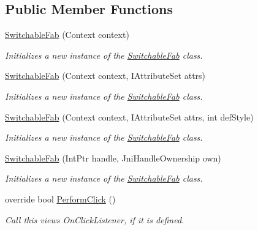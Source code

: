 \subsection*{Public Member Functions}
\begin{DoxyCompactItemize}
\item 
\hyperlink{class_w_c_c_mobile_1_1_switchable_fab_a8427440d9a6834d9a8f4debaf905da7b}{Switchable\+Fab} (Context context)
\begin{DoxyCompactList}\small\item\em Initializes a new instance of the \hyperlink{class_w_c_c_mobile_1_1_switchable_fab}{Switchable\+Fab} class. \end{DoxyCompactList}\item 
\hyperlink{class_w_c_c_mobile_1_1_switchable_fab_a9674454567b1e5661bca32b57ba10ab2}{Switchable\+Fab} (Context context, I\+Attribute\+Set attrs)
\begin{DoxyCompactList}\small\item\em Initializes a new instance of the \hyperlink{class_w_c_c_mobile_1_1_switchable_fab}{Switchable\+Fab} class. \end{DoxyCompactList}\item 
\hyperlink{class_w_c_c_mobile_1_1_switchable_fab_ab4d24c06b64058307cbaeae023a2e142}{Switchable\+Fab} (Context context, I\+Attribute\+Set attrs, int def\+Style)
\begin{DoxyCompactList}\small\item\em Initializes a new instance of the \hyperlink{class_w_c_c_mobile_1_1_switchable_fab}{Switchable\+Fab} class. \end{DoxyCompactList}\item 
\hyperlink{class_w_c_c_mobile_1_1_switchable_fab_a253c5a3888796e89248ff53a9772b2e2}{Switchable\+Fab} (Int\+Ptr handle, Jni\+Handle\+Ownership own)
\begin{DoxyCompactList}\small\item\em Initializes a new instance of the \hyperlink{class_w_c_c_mobile_1_1_switchable_fab}{Switchable\+Fab} class. \end{DoxyCompactList}\item 
override bool \hyperlink{class_w_c_c_mobile_1_1_switchable_fab_a51259df9d79a50bacc6493c950430e6a}{Perform\+Click} ()
\begin{DoxyCompactList}\small\item\em Call this view\textquotesingle{}s On\+Click\+Listener, if it is defined. \end{DoxyCompactList}\item 

\end{DoxyCompactItemize}
